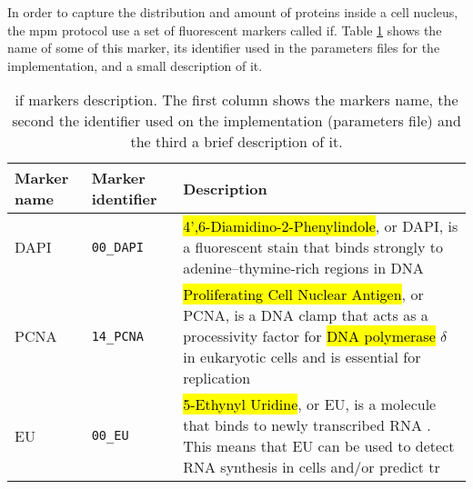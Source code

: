 
\glsresetall

In order to capture the distribution and amount of proteins inside a cell nucleus, the \gls{mpm} protocol use a set of fluorescent markers called \gls{if}. Table \ref{table:apendix:if_markers} shows the name of some of this marker, its identifier used in the parameters files for the implementation, and a small description of it.

\setlength{\mylinewidth}{\linewidth-7pt}%
\setlength{\mylengtha}{0.12\mylinewidth-2\arraycolsep}%
\setlength{\mylengthb}{0.15\mylinewidth-2\arraycolsep}%
\setlength{\mylengthc}{0.73\mylinewidth-2\arraycolsep}%

\begin{table}[!ht]
  \centering
  \begin{tabular}{>{\centering\arraybackslash}m{\mylengtha}|>{\centering\arraybackslash}m{\mylengthb}|m{\mylengthc}} %
    \hline
    Marker name & Marker identifier & Description \\
    \hline
    DAPI & \texttt{00\_DAPI} & \hl{4',6-Diamidino-2-Phenylindole}, or DAPI, is a fluorescent stain that binds strongly to adenine–thymine-rich regions in DNA \cite{kapuscinski1995dapi} \\
    \hline
    PCNA & \texttt{14\_PCNA} & \hl{Proliferating Cell Nuclear Antigen}, or PCNA, is a DNA clamp that acts as a processivity factor for \hl{DNA polymerase} $\delta$\footnotemark in eukaryotic cells and is essential for replication \cite{kisielewska2005gfp} \\
    \hline
    EU & \texttt{00\_EU} & \hl{5-Ethynyl Uridine}, or EU, is a molecule that binds to newly transcribed RNA \cite{jao2008exploring}. This means that EU can be used to detect RNA synthesis in cells and/or predict \gls{tr} \\
    \hline
  \end{tabular}
  \caption{\Acrlong{if} markers description. The first column shows the markers name, the second the identifier used on the implementation (parameters file) and the third a brief description of it.}
  \label{table:apendix:if_markers}
\end{table}
